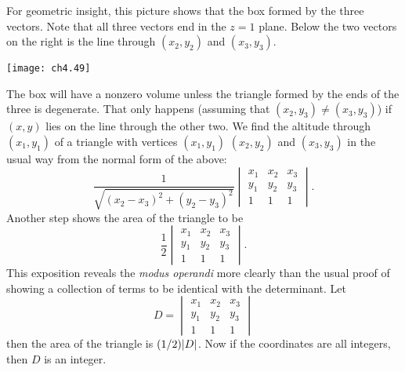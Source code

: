 \begin{exercises}
\begin{answer}
\begin{exparts}
        For geometric insight, this 
        picture shows that the box formed by the three vectors.
        Note that all 
        three vectors end in the $z=1$ plane.
        Below the two vectors on the right is the line through
        $(x_2,y_2)$ and $(x_3,y_3)$.
        \begin{center}
          \texttt{[image: ch4.49]}
        \end{center}
        The box will 
        have a nonzero volume unless the triangle formed by the ends of the
        three is degenerate.
        That only happens (assuming that $(x_2,y_3)\neq (x_3,y_3)$)
        if  $(x,y)$ lies on the line through the other two. 
       \partsitem \answerasgiven %
        We find the altitude through $(x_1,y_1)$ of a triangle with vertices
        $(x_1,y_1)$ $(x_2,y_2)$ and $(x_3,y_3)$ in the usual
        way from the normal form of the above:
        \begin{equation*}
          \frac{1}{\sqrt{(x_2-x_3)^2+(y_2-y_3)^2}}
          \begin{vmatrix}
            x_1  &x_2  &x_3  \\
            y_1  &y_2  &y_3  \\
            1    &1    &1
          \end{vmatrix}.
        \end{equation*}
        Another step shows the area of the triangle to be
        \begin{equation*}
          \frac{1}{2}
          \begin{vmatrix}
            x_1  &x_2  &x_3  \\
            y_1  &y_2  &y_3  \\
            1    &1    &1
          \end{vmatrix}.
        \end{equation*}
        This exposition reveals the \textit{modus operandi} more clearly
        than the usual proof of showing a collection of terms to be identical
        with the determinant.
       \partsitem  \answerasgiven %
        Let
        \begin{equation*}
          D=
          \begin{vmatrix}
            x_1  &x_2  &x_3  \\
            y_1  &y_2  &y_3  \\
            1    &1    &1
          \end{vmatrix}
        \end{equation*}
        then the area of the triangle is $(1/2)\deter{D}$.
        Now if the coordinates are all integers, then $D$ is an integer.
      \end{exparts}
    \end{answer}
\end{exercises}
